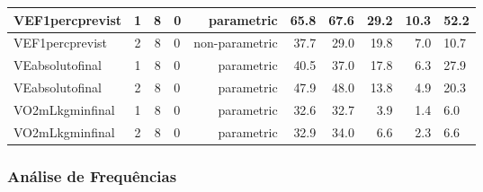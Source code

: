 \documentclass[
]{article}
\begin{document}
\begin{tabular}{l|c|c|l|r|r|r|r|r|l}
\hline
VEF1percprevist & 1 & 8 & 0 & parametric & 65.8 & 67.6 & 29.2 & 10.3 & 52.2\\
\hline
VEF1percprevist & 2 & 8 & 0 & non-parametric & 37.7 & 29.0 & 19.8 & 7.0 & 10.7\\
\hline
VEabsolutofinal & 1 & 8 & 0 & parametric & 40.5 & 37.0 & 17.8 & 6.3 & 27.9\\
\hline
VEabsolutofinal & 2 & 8 & 0 & parametric & 47.9 & 48.0 & 13.8 & 4.9 & 20.3\\
\hline
VO2mLkgminfinal & 1 & 8 & 0 & parametric & 32.6 & 32.7 & 3.9 & 1.4 & 6.0\\
\hline
VO2mLkgminfinal & 2 & 8 & 0 & parametric & 32.9 & 34.0 & 6.6 & 2.3 & 6.6\\
\hline
\end{tabular}

\hypertarget{anuxe1lise-de-frequuxeancias}{%
\subsubsection{Análise de
Frequências}\label{anuxe1lise-de-frequuxeancias}}
\end{document}
